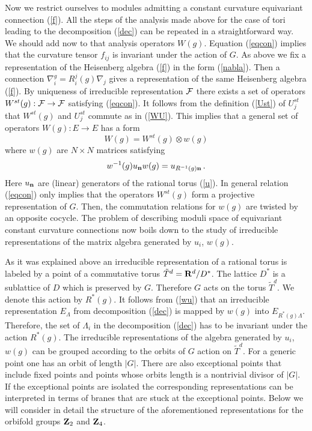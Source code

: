 \documentclass[a4paper,a4paper]{article}
\begin{document}
{ 
Now we restrict ourselves to modules admitting a constant curvature equivariant connection (\ref{f}). 
 All the steps of the analysis made above for the case of tori leading to the decomposition (\ref{dec}) can 
be repeated in a straightforward way. We should add now to 
that analysis operators $W(g)$. 
 Equation (\ref{eqcon}) implies that the curvature tensor $f_{ij}$ is invariant under the action of $G$. 
As above we fix a representation of the Heisenberg algebra (\ref{f}) in the form (\ref{nabla}).
Then a connection $\nabla^{g}_{i}= R_{i}^{j}(g)\nabla_{j}$ gives a representation of the same Heisenberg 
algebra (\ref{f}). By uniqueness of irreducible representation $\cal F$  there exists a set of operators 
$W^{st}(g): {\cal F} \to {\cal F}$ satisfying (\ref{eqcon}).   
It follows from the definition  (\ref{Ust}) of $U^{st}_{j}$  that $W^{st}(g)$ and $U^{st}_{j}$ 
commute as  in (\ref{WU}). This implies that a general set of operators $W(g):E\to E$ has a form 
\begin{equation}
W(g) = W^{st}(g)\otimes w(g) 
\end{equation}
where $w(g)$ are $N\times N$ matrices satisfying 
\begin{equation} \label{wu}
w^{-1}(g) u_{\bf n} w (g) =  u_{R^{-1}(g){\bf n}} \, .  
\end{equation}
Here $u_{\bf n}$ are (linear) generators  of the rational torus (\ref{u}). 
 In general  relation (\ref{eqcon}) only implies that  
the operators $W^{st}(g)$  form a projective representation of $G$. Then,  the commutation relations 
for $w(g)$ are twisted by an opposite cocycle. 
The problem of describing moduli space of equivariant constant curvature connections 
now boils down to the study of irreducible representations of the matrix algebra generated by $u_{i}$, $w(g)$. 


As it was explained above an irreducible representation of a rational torus is labeled by a point of a  
commutative torus $\tilde T^{d}= {\bf R}^{d}/D^{*}$. The lattice $D^{*}$ is a sublattice of $D$ 
which is preserved by $G$. Therefore $G$ acts on the torus $\tilde T^{d}$.
 We denote this action by $R^{*}(g)$.
It follows from (\ref{wu})  that an irreducible representation $E_{\Lambda}$ from decomposition (\ref{dec}) is mapped by  
$w(g)$ into $E_{R^{*}(g) \Lambda}$. Therefore, the set of $\Lambda_{i}$ in the decomposition (\ref{dec}) has to be invariant 
under the action $R^{*}(g)$. The irreducible representations of the algebra generated by $u_{i}$, $w(g)$ can be grouped 
according to the  orbits of $G$ action on $\tilde T^{d}$. For a generic point one has an orbit of length $|G|$. 
There are also exceptional points that include
fixed points and points whose orbits length is a nontrivial divisor of $|G|$. 
If the exceptional points are isolated the corresponding
 representations can be interpreted in terms of branes that are 
stuck at the exceptional points. 
Below we will consider in detail the structure of the aforementioned representations for the orbifold 
groups ${\bf Z}_{2}$ and ${\bf Z}_{4}$.  


}
\end{document}
